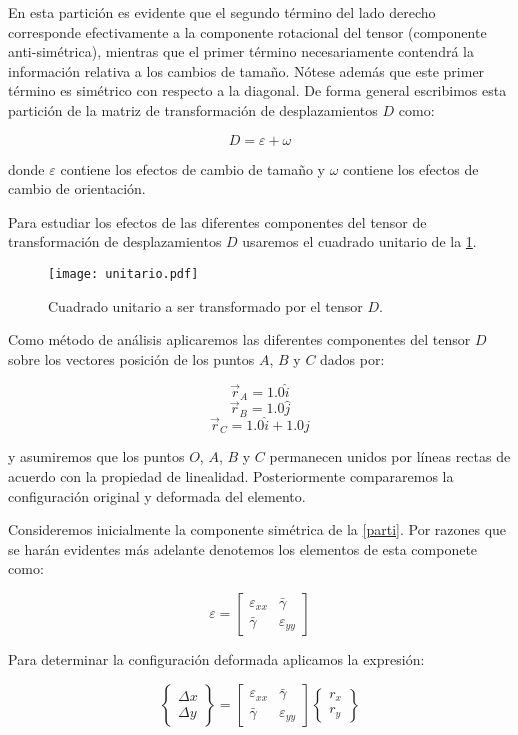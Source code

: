 \documentclass[../notas medios.tex]{subfiles}
\begin{document}
En esta partición es evidente que el segundo término del lado derecho corresponde efectivamente a la componente rotacional del tensor (componente anti-simétrica), mientras que el primer término necesariamente contendrá la información relativa a los cambios de tamaño. Nótese además que este primer término es simétrico con respecto a la diagonal. De forma general escribimos esta partición de la matriz de transformación de desplazamientos $D$ como:


\begin{equation}
D = \varepsilon  + \omega
\label{parti}
\end{equation}

donde $\varepsilon$ contiene los efectos de cambio de tamaño y $\omega$ contiene los efectos de cambio de orientación.

Para estudiar los efectos de las diferentes componentes del tensor de transformación de desplazamientos $D$ usaremos el cuadrado unitario de la \cref{unitario}.

\begin{figure}[H]
\centering
	\texttt{[image: unitario.pdf]}
	\caption{Cuadrado unitario a ser transformado por el tensor $D$.}
	\label{unitario}
\end{figure}

Como método de análisis aplicaremos las diferentes componentes del tensor $D$ sobre los vectores posición de los puntos $A$, $B$ y $C$ dados por:

\[{{\vec r}_A} = 1.0\hat i\]
\[{{\vec r}_B} = 1.0\hat j\]
\[{{\vec r}_C} = 1.0\hat i + 1.0\hat j\]

y asumiremos que los puntos $O$, $A$, $B$ y $C$ permanecen unidos por líneas rectas de acuerdo con la propiedad de linealidad. Posteriormente compararemos la configuración original y deformada del elemento.


Consideremos inicialmente la componente simétrica de la \cref{parti}. Por razones que se harán evidentes más adelante denotemos los elementos de esta componete como:

\[\varepsilon  = \left[ {\begin{array}{*{20}{c}}
{{\varepsilon _{xx}}}&\bar{\gamma} \\
\bar{\gamma} &{{\varepsilon _{yy}}}
\end{array}} \right]\]

Para determinar la configuración deformada aplicamos la expresión:

\[\left\{ {\begin{array}{*{20}{c}}
{\Delta x}\\
{\Delta y}
\end{array}} \right\} = \left[ {\begin{array}{*{20}{c}}
{{\varepsilon _{xx}}}&\bar{\gamma} \\
\bar{\gamma} &{{\varepsilon _{yy}}}
\end{array}} \right]\left\{ {\begin{array}{*{20}{c}}
{{r_x}}\\
{{r_y}}
\end{array}} \right\}\]
\end{document}
